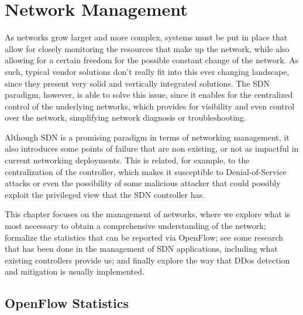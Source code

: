 \chapter{Network Management} \label{chap:nm} %

As networks grow larger and more complex, systems must be put in place that allow for closely monitoring the resources that make up the network, while also allowing for a certain freedom for the possible constant change of the 
network. As such, typical vendor solutions don't really fit into this ever changing landscape, since they present very solid and vertically integrated solutions. The SDN paradigm, however, is able to solve this issue, since it 
enables for the centralized control of the underlying networks, which provides for visibility and even control over the network, simplifying network diagnosis or troubleshooting. 
\par Although SDN is a promising paradigm in terms of networking management, it also introduces some points of failure that are non existing, or not as impactful in current networking deployments. This is related, for example,
to the centralization of the controller, which makes it susceptible to Denial-of-Service attacks or even the possibility of some malicious attacker that could possibly exploit the privileged view that the SDN controller has.
\par This chapter focuses on the management of networks, where we explore what is most necessary to obtain a comprehensive understanding of the network; formalize the statistics that can be reported via OpenFlow; see some 
research that has been done in the management of SDN applications, including what existing controllers provide us; and finally explore the way that DDos detection and mitigation is usually implemented.


\section {OpenFlow Statistics}





